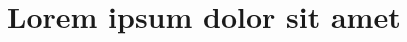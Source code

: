 \documentclass[
	12pt,				%
	openright,			%
	oneside,			%
	a4paper,			%
	chapter=TITLE,		%
	english,			%
	french,				%
	spanish,			%
	brazil				%
	]{ppgtecs-ifes-abntex2}
\begin{document}

\frenchspacing 


\imprimircapa
\imprimirfolhaderosto*


% 


% 


% 











\tableofcontents*
\cleardoublepage



\textual




\chapter{Lorem ipsum dolor sit amet}
\setlength\afterchapskip{\lineskip}
\end{document}
